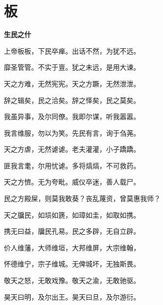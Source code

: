 \documentclass[12pt,a4paper]{ctexbook}
\begin{document}
\section{板}
\textbf{生民之什}\par\vspace{0.5em}
上帝板板，下民卒瘅。出话不然，为犹不远。\par
靡圣管管。不实于亶。犹之未远，是用大谏。\par
天之方难，无然宪宪。天之方蹶，无然泄泄。\par
辞之辑矣，民之洽矣。辞之怿矣，民之莫矣。\par
我虽异事，及尔同僚。我即尔谋，听我嚣嚣。\par
我言维服，勿以为笑。先民有言，询于刍荛。\par
天之方虐，无然谑谑。老夫灌灌，小子蹻蹻。\par
匪我言耄，尔用忧谑。多将熇熇，不可救药。\par
天之方懠。无为夸毗。威仪卒迷，善人载尸。\par
民之方殿屎，则莫我敢葵？丧乱蔑资，曾莫惠我师？\par
天之牖民，如埙如篪，如璋如圭，如取如携。\par
携无曰益，牖民孔易。民之多辟，无自立辟。\par
价人维藩，大师维垣，大邦维屏，大宗维翰，\par
怀德维宁，宗子维城。无俾城坏，无独斯畏。\par
敬天之怒，无敢戏豫。敬天之渝，无敢驰驱。\par
昊天曰明，及尔出王。昊天曰旦，及尔游衍。\par
\end{document}
